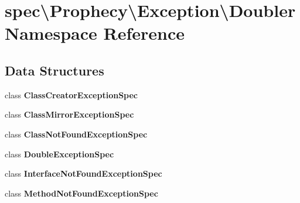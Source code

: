 \section{spec\textbackslash{}Prophecy\textbackslash{}Exception\textbackslash{}Doubler Namespace Reference}
\label{namespacespec_1_1_prophecy_1_1_exception_1_1_doubler}
\subsection*{Data Structures}
\begin{DoxyCompactItemize}
\item 
class {\bf Class\+Creator\+Exception\+Spec}
\item 
class {\bf Class\+Mirror\+Exception\+Spec}
\item 
class {\bf Class\+Not\+Found\+Exception\+Spec}
\item 
class {\bf Double\+Exception\+Spec}
\item 
class {\bf Interface\+Not\+Found\+Exception\+Spec}
\item 
class {\bf Method\+Not\+Found\+Exception\+Spec}
\end{DoxyCompactItemize}
